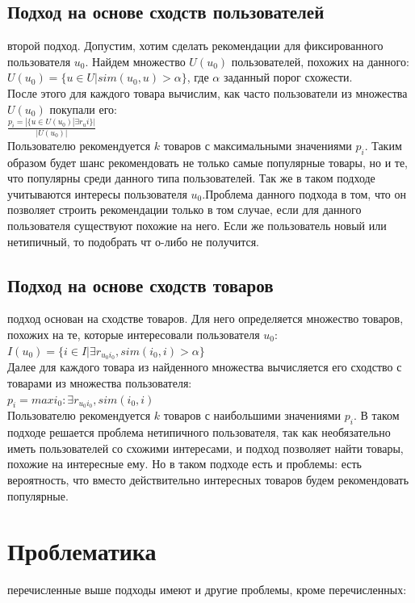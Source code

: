 \documentclass{article}
\newcommand\tab[1][1cm]{\hspace*{#1}}
\begin{document}
\subsection{Подход на основе сходств пользователей}
 второй подход. Допустим, хотим сделать рекомендации для фиксированного пользователя $u_0$. Найдем множество ﻿$U(u_0)$ пользователей, похожих на данного:\\
$U(u_0)=\{u\in U|sim(u_0,u)>\alpha\}$, где ﻿$\alpha$ заданный порог схожести.\\
После этого для каждого товара вычислим, как часто пользователи из множества $U(u_0)$ покупали его:\\
$\frac{p_i=|\{u\in U(u_0)|\exists r_ui\}|}{|U(u_0)|}$\\
Пользователю рекомендуется ﻿$k$ товаров с максимальными значениями ﻿$p_i$. Таким образом будет шанс рекомендовать не только самые популярные товары, но и те, что популярны среди данного типа пользователей. Так же в таком подходе учитываются интересы пользователя $u_0$﻿.Проблема данного подхода в том, что он позволяет строить рекомендации только в том случае, если для данного пользователя существуют похожие на него. Если же пользователь новый или нетипичный, то подобрать чт о-либо не получится.
\subsection{Подход на основе сходств товаров}
 подход основан на сходстве товаров. Для него определяется множество товаров, похожих на те, которые интересовали пользователя ﻿$u_0$:\\
$I(u_0)=\{i\in I|\exists r_{u_0i_0}, sim(i_0,i)>\alpha \}$\\
Далее для каждого товара из найденного множества вычисляется его сходство с товарами из множества пользователя:\\
$p_i=max i_0: \exists r_{u_0i_0},sim(i_0,i)$\\
Пользователю рекомендуется ﻿$k$ товаров с наибольшими значениями $p_i$﻿. В таком подходе решается проблема нетипичного пользователя, так как необязательно иметь пользователей со схожими интересами, и подход позволяет найти товары, похожие на интересные ему. Но в таком подходе есть и проблемы: есть вероятность, что вместо действительно интересных товаров будем рекомендовать популярные.
\section{Проблематика}
 перечисленные выше подходы имеют и другие проблемы, кроме перечисленных:
\end{document}
